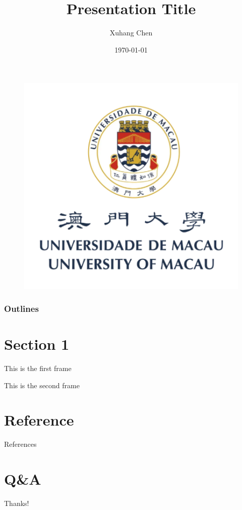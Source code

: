 \documentclass{beamer}
\author{Xuhang Chen}
\title{Presentation Title}
\institute{FST, Univeristy of Macau}
\date{\today}
\begin{document}
\begin{frame}
    \titlepage
    \begin{figure}[htpb]
        \begin{center}
            \includegraphics[width=0.2\linewidth]{pic/um_red.png}
        \end{center}
    \end{figure}
\end{frame}

\begin{frame}
    \frametitle{Outlines}
    \tableofcontents[sectionstyle=show,subsectionstyle=show/shaded/hide,subsubsectionstyle=show/shaded/hide]
\end{frame}


\section{Section 1}

\begin{frame}
    This is the first frame
\end{frame}

\begin{frame}
    This is the second frame
\end{frame}

\section*{Reference}

\begin{frame}[allowframebreaks]{References}
    
    
\end{frame}

\section*{Q\&A}

\begin{frame}
    \begin{center}
        {\Huge\calligra Thanks!}
    \end{center}
\end{frame}
\end{document}
